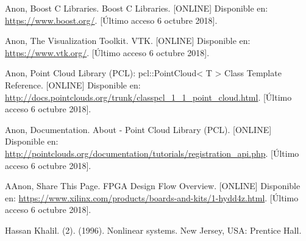 \begin{thebibliography}{99}
 Anon, Boost C Libraries. Boost C Libraries. [ONLINE] Disponible en: \url{ https://www.boost.org/}. [Último acceso 6 octubre 2018].


 Anon, The Visualization Toolkit. VTK. [ONLINE] Disponible en: \url{https://www.vtk.org/}. [Último acceso 6 octubre 2018].

 Anon, Point Cloud Library (PCL): pcl::PointCloud< T > Class Template Reference. [ONLINE] Disponible en: \url{http://docs.pointclouds.org/trunk/classpcl_1_1_point_cloud.html}. [Último acceso 6 octubre 2018].


 Anon, Documentation. About - Point Cloud Library (PCL).  [ONLINE] Disponible en: \url{http://pointclouds.org/documentation/tutorials/registration_api.php}. [Último acceso 6 octubre 2018].



 AAnon, Share This Page. FPGA Design Flow Overview.   [ONLINE] Disponible en: \url{https://www.xilinx.com/products/boards-and-kits/1-hydd4z.html}. [Último acceso 6 octubre 2018].













 Hassan Khalil. (2). (1996). Nonlinear systems. New Jersey, USA: Prentice Hall. %
\end{thebibliography}